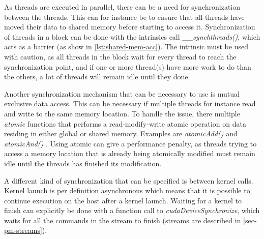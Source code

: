As threads are executed in parallel, there can be a need for synchronization between the threads.
This can for instance be to ensure that all threads have moved their data to shared memory before starting to access it.
Synchronization of threads in a block can be done with the intrinsics call \textit{\_\_synchthreads()}, which acts as a barrier (as show in \autoref{lst:shared-mem-acc}).
The intrinsic must be used with caution, as all threads in the block wait for every thread to reach the synchronization point, and if one or more thread(s) have more work to do than the others, a lot of threads will remain idle until they done.

Another synchronization mechanism that can be necessary to use is mutual exclusive data access.
This can be necessary if multiple threads for instance read and write to the same memory location.
To handle the issue, there multiple \textit{atomic} functions that performs a read-modify-write atomic operation on data residing in either global or shared memory.
Examples are \textit{atomicAdd()} and \textit{atomicAnd()} \cite{cuda:programmingguide}.
Using atomic can give a performance penalty, as threads trying to access a memory location that is already being atomically modified must remain idle until the threads has finished its modification.

A different kind of synchronization that can be specified is between kernel calls.
Kernel launch is per definition asynchronous which means that it is possible to continue execution on the host after a kernel launch.
Waiting for a kernel to finish can explicitly be done with a function call to \textit{cudaDeviceSynchronize}, which waits for all the commands in the stream to finish (streams are described in \autoref{sec-pm-streams}).